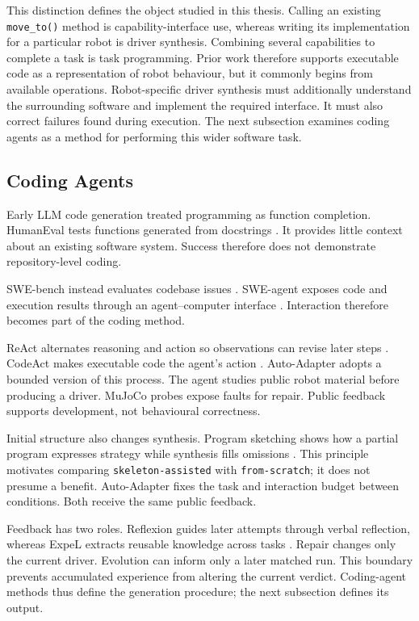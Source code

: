 This distinction defines the object studied in this thesis. Calling an
existing \texttt{move\_to()} method is capability-interface use, whereas
writing its implementation for a particular robot is driver synthesis.
Combining several capabilities to complete a task is task programming. Prior
work therefore supports executable code as a representation of robot
behaviour, but it commonly begins from available operations. Robot-specific
driver synthesis must additionally understand the surrounding software and
implement the required interface. It must also correct failures found during
execution. The next subsection examines coding agents as a method for
performing this wider software task.

\subsection{Coding Agents}
\label{sec:coding-agents}

Early LLM code generation treated programming as function completion. HumanEval
tests functions generated from docstrings \citep{chen2021codex}. It provides
little context about an existing software system. Success therefore does not
demonstrate repository-level coding.

SWE-bench instead evaluates codebase issues \citep{jimenez2024swebench}.
SWE-agent exposes code and execution results through an agent--computer
interface \citep{yang2024sweagent}. Interaction therefore becomes part of the
coding method.

ReAct alternates reasoning and action so observations can revise later steps
\citep{yao2023react}. CodeAct makes executable code the agent's action
\citep{wang2024codeact}. Auto-Adapter adopts a bounded version of this process.
The agent studies public robot material before producing a driver. MuJoCo probes
expose faults for repair. Public feedback supports development, not behavioural
correctness.

Initial structure also changes synthesis. Program sketching shows how a partial
program expresses strategy while synthesis fills omissions
\citep{solarlezama2013sketching}. This principle motivates comparing
\texttt{skeleton-assisted} with \texttt{from-scratch}; it does not presume a
benefit. Auto-Adapter fixes the task and interaction budget between conditions.
Both receive the same public feedback.

Feedback has two roles. Reflexion guides later attempts through verbal
reflection, whereas ExpeL extracts reusable knowledge across tasks
\citep{shinn2023reflexion,zhao2024expel}. Repair changes only the current driver.
Evolution can inform only a later matched run. This boundary prevents
accumulated experience from altering the current verdict. Coding-agent methods
thus define the generation procedure; the next subsection defines its output.


